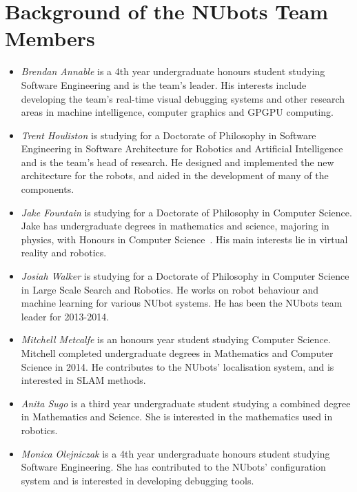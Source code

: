 \documentclass{llncs}
\begin{document}
\section{Background of the NUbots Team Members}
\begin{itemize}

\item \emph{Brendan Annable} is a 4th year undergraduate honours student studying Software Engineering and is the team's leader. His interests include developing the team's real-time visual debugging systems and other research areas in machine intelligence, computer graphics and GPGPU computing.

\item \emph{Trent Houliston} is studying for a Doctorate of Philosophy in Software Engineering in Software Architecture for Robotics and Artificial Intelligence and is the team's head of research. He designed and implemented the new architecture for the robots, and aided in the development of many of the components.

\item \emph{Jake Fountain} is studying for a Doctorate of Philosophy in Computer Science. Jake has undergraduate degrees in mathematics and science, majoring in physics, with Honours in Computer Science~\cite{fountain2015pointofregard}. His main interests lie in virtual reality and robotics.

\item \emph{Josiah Walker} is studying for a Doctorate of Philosophy in Computer Science in Large Scale Search and Robotics. He works on robot behaviour and machine learning for various NUbot systems. He has been the NUbots team leader for 2013-2014.

\item \emph{Mitchell Metcalfe} is an honours year student studying Computer Science. Mitchell completed undergraduate degrees in Mathematics and Computer Science in 2014. He contributes to the NUbots' localisation system, and is interested in SLAM methods.

\item \emph{Anita Sugo} is a third year undergraduate student studying a combined degree in Mathematics and Science. She is interested in the mathematics used in robotics.

\item \emph{Monica Olejniczak} is a 4th year undergraduate honours student studying Software Engineering. She has contributed to the NUbots' configuration system and is interested in developing debugging tools.


\end{itemize}
\end{document}
